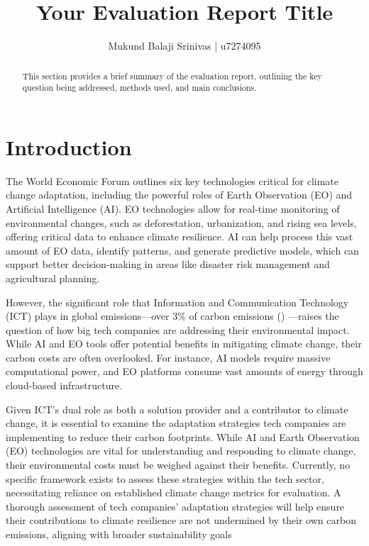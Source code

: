 \documentclass[12pt]{article}
\title{Your Evaluation Report Title}
\author{Mukund Balaji Srinivas | u7274095}
\begin{document}
\maketitle

\begin{abstract}
This section provides a brief summary of the evaluation report, outlining the key question being addressed, methods used, and main conclusions.
\end{abstract}

\newpage

\section*{Introduction}
The World Economic Forum  outlines six key technologies critical for climate change adaptation, including the powerful roles of Earth Observation (EO) and Artificial Intelligence (AI). EO technologies allow for real-time monitoring of environmental changes, such as deforestation, urbanization, and rising sea levels, offering critical data to enhance climate resilience. AI can help process this vast amount of EO data, identify patterns, and generate predictive models, which can support better decision-making in areas like disaster risk management and agricultural planning.

However, the significant role that Information and Communication Technology (ICT) plays in global emissions—over 3\% of carbon emissions (\cite{jones_2018}) —raises the question of how big tech companies are addressing their environmental impact. While AI and EO tools offer potential benefits in mitigating climate change, their carbon costs are often overlooked. For instance, AI models require massive computational power, and EO platforms consume vast amounts of energy through cloud-based infrastructure.

Given ICT's dual role as both a solution provider and a contributor to climate change, it is essential to examine the adaptation strategies tech companies are implementing to reduce their carbon footprints. While AI and Earth Observation (EO) technologies are vital for understanding and responding to climate change, their environmental costs must be weighed against their benefits. Currently, no specific framework exists to assess these strategies within the tech sector, necessitating reliance on established climate change metrics for evaluation. A thorough assessment of tech companies' adaptation strategies will help ensure their contributions to climate resilience are not undermined by their own carbon emissions, aligning with broader sustainability goals
\end{document}
